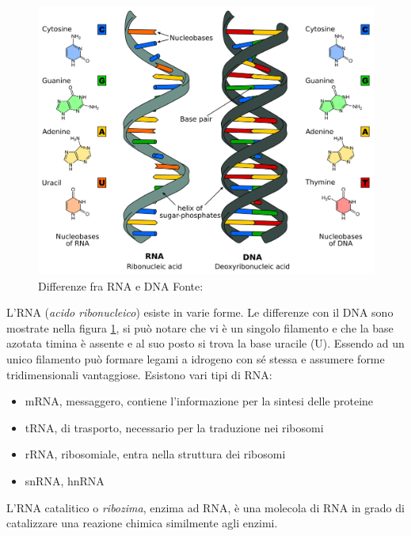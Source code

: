 \begin{figure}[h]
	\centering
	\includegraphics[scale=0.15]{images/dna-rna.png}
	\caption{Differenze fra RNA e DNA Fonte: \cite{dna-rna-image}}
	\label{fig:rna-dna-differenze}
\end{figure}

\par L'RNA (\textit{acido ribonucleico}) esiste in varie forme. Le differenze con il DNA sono mostrate nella figura \ref{fig:rna-dna-differenze}, si può notare che vi è un singolo filamento e che la base azotata timina è assente e al suo posto si trova la base uracile (U). Essendo ad un unico filamento può formare legami a idrogeno con sé stessa e assumere forme tridimensionali vantaggiose. Esistono vari tipi di RNA: 

\begin{itemize}
	\item mRNA, messaggero, contiene l'informazione per la sintesi delle proteine
	\item tRNA, di trasporto, necessario per la traduzione nei ribosomi
	\item rRNA, ribosomiale, entra nella struttura dei ribosomi
	\item snRNA, hnRNA
\end{itemize}

L'RNA catalitico o \textit{ribozima}, enzima ad RNA, è una molecola di RNA in grado di catalizzare una reazione chimica similmente agli enzimi. \\

